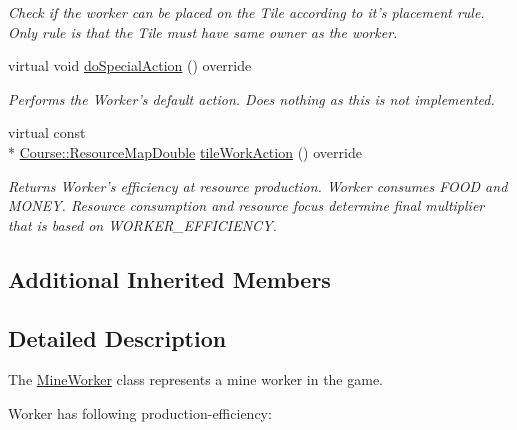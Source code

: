 \begin{DoxyCompactItemize}
\begin{DoxyCompactList}\small\item\em Check if the worker can be placed on the Tile according to it's placement rule. Only rule is that the Tile must have same owner as the worker. \end{DoxyCompactList}\item 
virtual void \hyperlink{classGame_1_1MineWorker_a5faef20674a0d6408115461032e32edf}{do\-Special\-Action} () override
\begin{DoxyCompactList}\small\item\em Performs the Worker's default action. Does nothing as this is not implemented. \end{DoxyCompactList}\item 
virtual const \\*
\hyperlink{namespaceCourse_a0b96bae1a664dde34efbb1b42dea615e}{Course\-::\-Resource\-Map\-Double} \hyperlink{classGame_1_1MineWorker_a515a32b59f08ee1577210887166dacb0}{tile\-Work\-Action} () override
\begin{DoxyCompactList}\small\item\em Returns Worker's efficiency at resource production. Worker consumes F\-O\-O\-D and M\-O\-N\-E\-Y. Resource consumption and resource focus determine final multiplier that is based on W\-O\-R\-K\-E\-R\-\_\-\-E\-F\-F\-I\-C\-I\-E\-N\-C\-Y. \end{DoxyCompactList}\end{DoxyCompactItemize}
\subsection*{Additional Inherited Members}


\subsection{Detailed Description}
The \hyperlink{classGame_1_1MineWorker}{Mine\-Worker} class represents a mine worker in the game. 

Worker has following production-\/efficiency\-: \par

